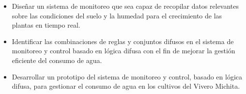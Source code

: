 \begin{itemize}
	\item Diseñar un sistema de monitoreo que sea capaz de recopilar datos relevantes sobre las condiciones del suelo y la humedad para el crecimiento de las plantas en tiempo real.
    \item Identificar las combinaciones de reglas y conjuntos difusos en el sistema de monitoreo y control basado en lógica difusa con el fin de mejorar la gestión eficiente del consumo de agua.
    \item Desarrollar un prototipo del sistema de monitoreo y control, basado en lógica difusa, para gestionar el consumo de agua en los cultivos del Vivero Michita.
\end{itemize}